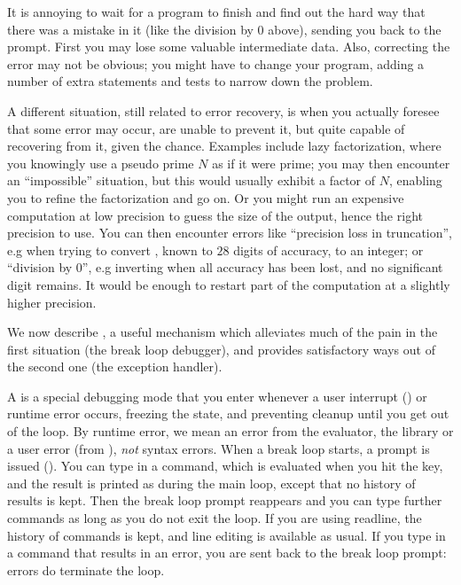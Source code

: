 It is annoying to wait for a program to finish and find out the hard
way that there was a mistake in it (like the division by 0 above), sending
you back to the prompt. First you may lose some valuable intermediate data.
Also, correcting the error may not be obvious; you might have to change your
program, adding a number of extra statements and tests to narrow down
the problem.

A different situation, still related to error recovery, is when you
actually foresee that some error may occur, are unable to prevent it, but
quite capable of recovering from it, given the chance. Examples include lazy
factorization, where you knowingly use a pseudo prime $N$ as if it were
prime; you may then encounter an ``impossible'' situation, but this would
usually exhibit a factor of $N$, enabling you to refine the factorization and
go on. Or you might run an expensive computation at low precision to guess
the size of the output, hence the right precision to use. You can then
encounter errors like ``precision loss in truncation'', e.g when trying to
convert , known to $28$ digits of accuracy, to an integer; or
``division by 0'', e.g inverting  when all accuracy has been
lost, and no significant digit remains. It would be enough to restart part of
the computation at a slightly higher precision.

We now describe , a useful mechanism which alleviates
much of the pain in the first situation (the break loop debugger), and
provides satisfactory ways out of the second one (the  exception
handler).

\label{se:break_loop}

A  is a special debugging mode that you enter whenever a
user interrupt () or runtime error occurs, freezing the
 state, and preventing cleanup until you get out of the loop. By
runtime error, we mean an error from the evaluator, the library or a user error
(from ), \emph{not} syntax errors. When a break loop starts, a
prompt is issued (). You can type in a  command, which is
evaluated when you hit the  key, and the result is printed as
during the main  loop, except that no history of results is kept. Then
the break loop prompt reappears and you can type further commands as long as
you do not exit the loop. If you are using readline, the history of commands is
kept, and line editing is available as usual. If you type in a command that
results in an error, you are sent back to the break loop prompt: errors do
 terminate the loop.

